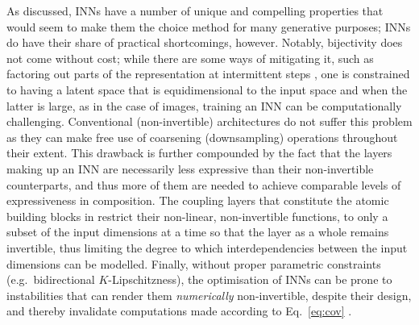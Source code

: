 %
As discussed, \acp{INN} have a number of unique and compelling properties that would seem to make them
the choice method for many generative purposes; \acp{INN} do have their share of practical
shortcomings, however. 
%
Notably, bijectivity does not come without cost; while there are some ways of mitigating it, such as
factoring out parts of the representation at intermittent steps \citep{hoogeboom2019integer}, one
is constrained to having a latent space that is equidimensional to the input space and when the
latter is large, as in the case of images, training an \ac{INN} can be computationally challenging.
%
Conventional (non-invertible) architectures do not suffer this problem as they can make free use of
coarsening (downsampling) operations throughout their extent.
%
This drawback is further compounded by the fact that the layers making up an \ac{INN} are
necessarily less expressive than their non-invertible counterparts, and thus more of them are
needed to achieve comparable levels of expressiveness in composition. 
%
The coupling layers that constitute the atomic building blocks in \citet{dinh2014nice} restrict
their non-linear, non-invertible functions, to only a subset of the input dimensions at a time so
that the layer as a whole remains invertible, thus limiting the degree to which interdependencies
between the input dimensions can be modelled.
%
Finally, without proper parametric constraints (e.g.\ bidirectional \(K\)-Lipschitzness), the
optimisation of \acp{INN} can be prone to instabilities that can render them \emph{numerically}
non-invertible, despite their design, and thereby invalidate computations made according to
Eq.~\ref{eq:cov} \citep{behrmann2021understanding}.
